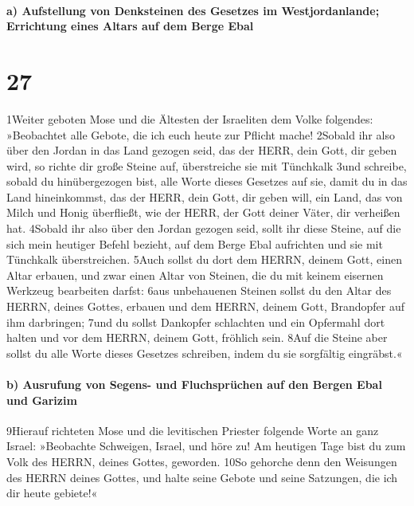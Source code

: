 \hypertarget{a-aufstellung-von-denksteinen-des-gesetzes-im-westjordanlande-errichtung-eines-altars-auf-dem-berge-ebal}{%
\paragraph{a) Aufstellung von Denksteinen des Gesetzes im
Westjordanlande; Errichtung eines Altars auf dem Berge
Ebal}\label{a-aufstellung-von-denksteinen-des-gesetzes-im-westjordanlande-errichtung-eines-altars-auf-dem-berge-ebal}}

\hypertarget{section-26}{%
\section{27}\label{section-26}}

1Weiter geboten Mose und die Ältesten der Israeliten dem Volke
folgendes: »Beobachtet alle Gebote, die ich euch heute zur Pflicht
mache! 2Sobald ihr also über den Jordan in das Land gezogen seid, das
der HERR, dein Gott, dir geben wird, so richte dir große Steine auf,
überstreiche sie mit Tünchkalk 3und schreibe, sobald du hinübergezogen
bist, alle Worte dieses Gesetzes auf sie, damit du in das Land
hineinkommst, das der HERR, dein Gott, dir geben will, ein Land, das von
Milch und Honig überfließt, wie der HERR, der Gott deiner Väter, dir
verheißen hat. 4Sobald ihr also über den Jordan gezogen seid, sollt ihr
diese Steine, auf die sich mein heutiger Befehl bezieht, auf dem Berge
Ebal aufrichten und sie mit Tünchkalk überstreichen. 5Auch sollst du
dort dem HERRN, deinem Gott, einen Altar erbauen, und zwar einen Altar
von Steinen, die du mit keinem eisernen Werkzeug bearbeiten darfst: 6aus
unbehauenen Steinen sollst du den Altar des HERRN, deines Gottes,
erbauen und dem HERRN, deinem Gott, Brandopfer auf ihm darbringen; 7und
du sollst Dankopfer schlachten und ein Opfermahl dort halten und vor dem
HERRN, deinem Gott, fröhlich sein. 8Auf die Steine aber sollst du alle
Worte dieses Gesetzes schreiben, indem du sie sorgfältig eingräbst.«

\hypertarget{b-ausrufung-von-segens--und-fluchspruxfcchen-auf-den-bergen-ebal-und-garizim}{%
\paragraph{b) Ausrufung von Segens- und Fluchsprüchen auf den Bergen
Ebal und
Garizim}\label{b-ausrufung-von-segens--und-fluchspruxfcchen-auf-den-bergen-ebal-und-garizim}}

9Hierauf richteten Mose und die levitischen Priester folgende Worte an
ganz Israel: »Beobachte Schweigen, Israel, und höre zu! Am heutigen Tage
bist du zum Volk des HERRN, deines Gottes, geworden. 10So gehorche denn
den Weisungen des HERRN deines Gottes, und halte seine Gebote und seine
Satzungen, die ich dir heute gebiete!«

